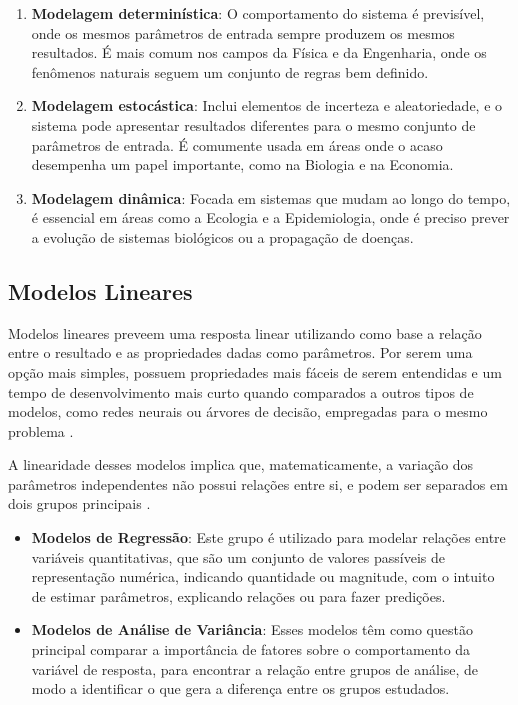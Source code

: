 \documentclass[
    12pt,               %
    openright,          %
    oneside,            %
    a4paper,            %
    english,            %
    brazil              %
    ]{abntex2}
\begin{document}
\begin{enumerate}
    \item \textbf{Modelagem determinística}: O comportamento do sistema é previsível, onde os mesmos parâmetros de 
entrada sempre produzem os mesmos resultados. É mais comum nos campos da Física e da Engenharia, onde os 
fenômenos naturais seguem um conjunto de regras bem definido.
    \item \textbf{Modelagem estocástica}: Inclui elementos de incerteza e aleatoriedade, e o sistema pode apresentar
resultados diferentes para o mesmo conjunto de parâmetros de entrada. É comumente usada em áreas onde o acaso 
desempenha um papel importante, como na Biologia e na Economia.
    \item \textbf{Modelagem dinâmica}: Focada em sistemas que mudam ao longo do tempo, é essencial em áreas como a
Ecologia e a Epidemiologia, onde é preciso prever a evolução de sistemas biológicos ou a propagação
de doenças. 
\end{enumerate}

\subsection{Modelos Lineares}

Modelos lineares preveem uma resposta linear utilizando como base a relação entre o resultado
e as propriedades dadas como parâmetros. Por serem uma opção mais simples, possuem propriedades mais fáceis de
serem entendidas e um tempo de desenvolvimento mais curto quando comparados a outros tipos de modelos,
como redes neurais ou árvores de decisão, empregadas para o mesmo problema \cite{modelos_lineares}.

A linearidade desses modelos implica que, matematicamente, a variação dos parâmetros independentes não
possui relações entre si, e podem ser separados em dois grupos principais \cite{tipos_modelos_lineares}.
\begin{itemize}
    \item \textbf{Modelos de Regressão}:
    Este grupo é utilizado para modelar relações entre variáveis quantitativas, que são um conjunto de
valores passíveis de representação numérica, indicando quantidade ou magnitude, com o intuito de estimar
parâmetros, explicando relações ou para fazer predições.
    \item \textbf{Modelos de Análise de Variância}:
    Esses modelos têm como questão principal comparar a importância de fatores sobre o comportamento da
variável de resposta, para encontrar a relação entre grupos de análise, de modo a identificar o que
gera a diferença entre os grupos estudados.
\end{itemize}
\end{document}
